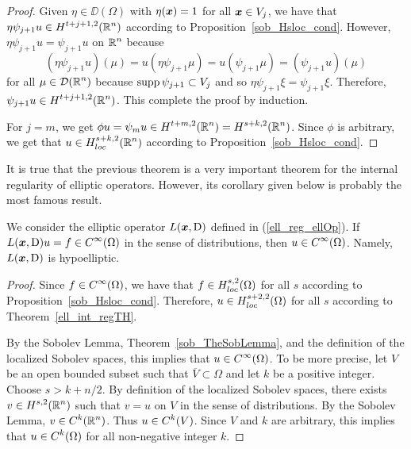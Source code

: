 \begin{proof}
Given $\eta \in \DD(\Omega)$ with $\eta({\bm{x}}) = 1$ for all
${\bm{x}} \in V_j$, we have that
$\displaystyle \eta \psi_{j+1} u \in H^{t+j+1,2}(\mathbb{R}^n)$
according to Proposition~\ref{sob_Hsloc_cond}.  However,
$\eta \psi_{j+1} u = \psi_{j+1} u$ on $\displaystyle \mathbb{R}^n$ because
\[
(\eta \psi_{j+1} u)(\mu) = u\left(\eta \psi_{j+1} \mu\right) =
u\left(\psi_{j+1} \mu\right) = (\psi_{j+1} u)(\mu)
\]
for all $\displaystyle \mu \in \mathcal{D}(\mathbb{R}^n)$ because
$\operatorname{supp} \psi_{j+1} \subset V_j$ and
so $\eta \psi_{j+1} \xi = \psi_{j+1} \xi$.
Therefore, $\displaystyle \psi_{j+1} u \in H^{t+j+1,2}(\mathbb{R}^n)$.
This complete the proof by induction.

For $j=m$, we get $\displaystyle \phi u = \psi_m u \in H^{t+m,2}(\mathbb{R}^n)
= H^{s+k,2}(\mathbb{R}^n)$.  Since $\phi$ is arbitrary, we get that
$\displaystyle u \in H^{s+k,2}_{loc}(\mathbb{R}^n)$ according to
Proposition~\ref{sob_Hsloc_cond}.
\end{proof}

It is true that the previous theorem is a very important theorem for
the internal regularity of elliptic operators.  However, its corollary
given below is probably the most famous result.

\begin{cor} \label{ell_Hak_Cinfty}
We consider the elliptic operator $L({\bm{x}},\operatorname{D})$ defined in
(\ref{ell_reg_ellOp}).  If
$\displaystyle L({\bm{x}},\operatorname{D})u = f \in C^\infty(\Omega)$ in
the sense of distributions, then $\displaystyle u \in C^\infty(\Omega)$.
Namely, $L({\bm{x}},\operatorname{D})$ is hypoelliptic.
\end{cor}

\begin{proof}
Since $\displaystyle f \in C^\infty(\Omega)$, we have that
$\displaystyle f \in H^{s,2}_{loc}(\Omega)$
for all $s$ according to Proposition~\ref{sob_Hsloc_cond}.
Therefore, $\displaystyle u \in H^{s+2,2}_{loc}(\Omega)$ for all $s$
according to Theorem~\ref{ell_int_regTH}.

By the Sobolev Lemma, Theorem~\ref{sob_TheSobLemma}, and the
definition of the localized Sobolev spaces, this implies that
$\displaystyle u \in C^\infty(\Omega)$.  To be more precise, let $V$ be an open
bounded subset such that $\overline{V} \subset \Omega$ and let $k$ be
a positive integer.  Choose $s > k + n/2$.
By definition of the localized Sobolev spaces, there exists
$\displaystyle v \in H^{s,2}(\mathbb{R}^n)$ such that $v=u$ on $V$ in the
sense of distributions.  By the Sobolev Lemma,
$\displaystyle v \in C^k(\mathbb{R}^n)$.  Thus
$\displaystyle u \in C^k(V)$.  Since $V$ and $k$
are arbitrary, this implies that $\displaystyle u\in C^k(\Omega)$ for all
non-negative integer $k$.
\end{proof}


